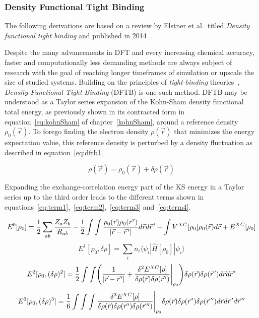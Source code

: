 \documentclass[12pt]{article}
\newcommand{\pvec}[1]{\vec{#1}\mkern2mu\vphantom{#1}}
\begin{document}
\subsubsection{Density Functional Tight Binding}
The following derivations are based on a review by Elstner et al.~titled \textit{Density functional tight binding} and published in 2014~\cite{Elstner2014-zp}.
\\ \par \noindent Despite the many advancements in DFT and every increasing chemical accuracy, faster and computationally less demanding methods are always subject of research with the goal of reaching longer timeframes of simulation or upscale the size of studied systems.
Building on the principles of \textit{tight-binding} theories~\cite{Goringe1997},  \textit{Density Functional Tight Binding} (DFTB) is one such method.
DFTB may be understood as a Taylor series expansion of the Kohn-Sham density functional total energy, as previously shown in its contracted form in equation~\ref{eq:kohnSham} of chapter~\ref{kohnSham}, around a reference density $\rho_0(\vec{r})$.
To forego finding the electron density $\rho(\vec{r})$ that minimizes the energy expectation value, this reference density is perturbed by a density fluctuation as described in equation~\ref{eq:dftb1}.

\begin{equation}
  \rho(\vec{r}) = \rho_0(\vec{r}) + \delta\rho(\vec{r})
  \label{eq:dftb1}
\end{equation}

\bigskip

\noindent Expanding the exchange-correlation energy part of the KS energy in a Taylor series up to the third order leads to the different terms shown in equations~\ref{eq:term1},~\ref{eq:term2},~\ref{eq:term3} and~\ref{eq:term4}.

\begin{equation}
  E^{0}[\rho_0] = \frac{1}{2}\sum_{ab}^{}\frac{Z_a Z_b}{R_{ab}} - \frac{1}{2} \int\int \frac{\rho_0(\vec{r})\rho_0(\pvec{r}')}{|\vec{r}-\pvec{r}'|}d\vec{r}d\pvec{r}' - \int V^{XC}[\rho_0]\rho_0(\vec{r})d\vec{r}+E^{XC}[\rho_0] \\
  \label{eq:term1}
\end{equation}
\begin{equation}
  E^1[\rho_0, \delta\rho] = \sum_{i}^{}n_i \langle\psi_i|\hat{H}[\rho_0]|\psi_i\rangle
  \label{eq:term2}
\end{equation}
\begin{equation}
  E^2[\rho_0, (\delta\rho)^2] = \frac{1}{2}\int\int\Biggl(\frac{1}{|\vec{r}-\pvec{r}'|}+\frac{\delta^2E^{XC}[\rho]}{\delta\rho(\vec{r})\delta\rho(\pvec{r}')}\Biggr|_{\rho_0}\Biggr)\delta\rho(\vec{r})\delta\rho(\pvec{r}')d\vec{r}d\pvec{r}'
  \label{eq:term3}
\end{equation}
\begin{equation}
  E^3[\rho_0, (\delta\rho)^3] = \frac{1}{6}\int\int\int\frac{\delta^3E^{XC}[\rho]}{\delta\rho(\vec{r})\delta\rho(\pvec{r}')\delta\rho(\pvec{r}'')}\Biggr|_{\rho_0}\delta\rho(\vec{r})\delta\rho(\pvec{r}')\delta\rho(\pvec{r}'')d\vec{r}d\pvec{r}'d\pvec{r}''
  \label{eq:term4}
\end{equation}
\end{document}
